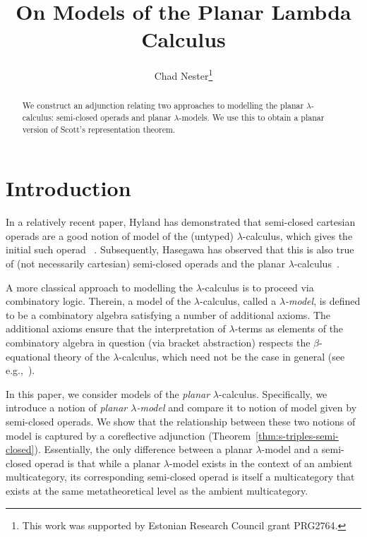 \documentclass{llncs}
\begin{document}
%
\title{On Models of the Planar Lambda Calculus}

\author{Chad Nester\thanks{This work was supported by Estonian Research Council grant PRG2764.}}


\maketitle             
%
\begin{abstract}
  We construct an adjunction relating two approaches to modelling the planar $\lambda$-calculus: semi-closed operads and planar $\lambda$-models. We use this to obtain a planar version of Scott's representation theorem.

\end{abstract}

\section{Introduction}

In a relatively recent paper, Hyland has demonstrated that semi-closed cartesian operads are a good notion of model of the (untyped) $\lambda$-calculus, which gives the initial such operad ~\cite{Hyland2017}. Subsequently, Hasegawa has observed that this is also true of (not necessarily cartesian) semi-closed operads and the planar $\lambda$-calculus~\cite{Hasegawa2023Planar}.

A more classical approach to modelling the $\lambda$-calculus is to proceed via combinatory logic. Therein, a model of the $\lambda$-calculus, called a \emph{$\lambda$-model}, is defined to be a combinatory algebra satisfying a number of additional axioms. The additional axioms ensure that the interpretation of $\lambda$-terms as elements of the combinatory algebra in question (via bracket abstraction) respects the $\beta$-equational theory of the $\lambda$-calculus, which need not be the case in general (see e.g.,~\cite{Barendregt1981,Hindley2008}).

In this paper, we consider models of the \emph{planar} $\lambda$-calculus. Specifically, we introduce a notion of \emph{planar $\lambda$-model} and compare it to notion of model given by semi-closed operads. We show that the relationship between these two notions of model is captured by a coreflective adjunction (Theorem~\ref{thm:s-triples-semi-closed}). Essentially, the only difference between a planar $\lambda$-model and a semi-closed operad is that while a planar $\lambda$-model exists in the context of an ambient multicategory, its corresponding semi-closed operad is itself a multicategory that exists at the same metatheoretical level as the ambient multicategory.
\end{document}
